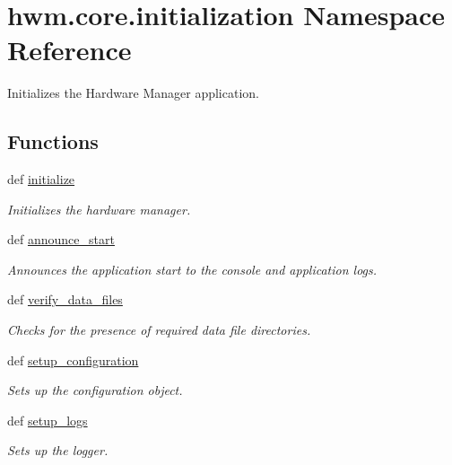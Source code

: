 \hypertarget{namespacehwm_1_1core_1_1initialization}{\section{hwm.\-core.\-initialization Namespace Reference}
\label{namespacehwm_1_1core_1_1initialization}
}


Initializes the Hardware Manager application.  


\subsection*{Functions}
\begin{DoxyCompactItemize}
\item 
def \hyperlink{namespacehwm_1_1core_1_1initialization_ae81383c152b341507c55ef3cb8cf7123}{initialize}
\begin{DoxyCompactList}\small\item\em Initializes the hardware manager. \end{DoxyCompactList}\item 
def \hyperlink{namespacehwm_1_1core_1_1initialization_a7edc944436e31525a995216455432dc7}{announce\-\_\-start}
\begin{DoxyCompactList}\small\item\em Announces the application start to the console and application logs. \end{DoxyCompactList}\item 
def \hyperlink{namespacehwm_1_1core_1_1initialization_a8a19289c66bb5780589d66859cecbfb3}{verify\-\_\-data\-\_\-files}
\begin{DoxyCompactList}\small\item\em Checks for the presence of required data file directories. \end{DoxyCompactList}\item 
def \hyperlink{namespacehwm_1_1core_1_1initialization_a5c42fc78a42bf209608f5a56286994fc}{setup\-\_\-configuration}
\begin{DoxyCompactList}\small\item\em Sets up the configuration object. \end{DoxyCompactList}\item 
def \hyperlink{namespacehwm_1_1core_1_1initialization_a208f248b1b09e33ca99f203abe4e8058}{setup\-\_\-logs}
\begin{DoxyCompactList}\small\item\em Sets up the logger. \end{DoxyCompactList}\end{DoxyCompactItemize}



